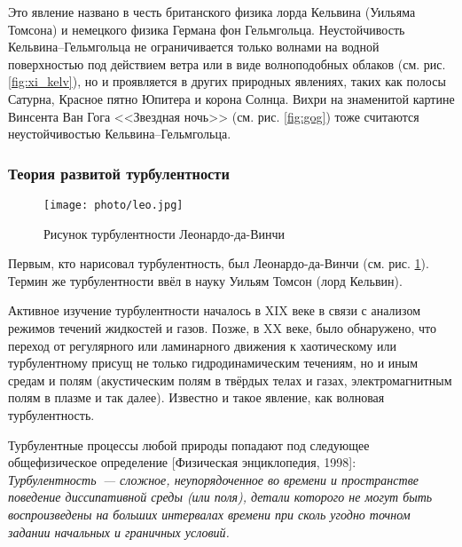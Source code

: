 
Это явление названо в честь британского физика лорда Кельвина (Уильяма Томсона) и немецкого физика Германа фон Гельмгольца. Неустойчивость Кельвина--Гельмгольца не ограничивается только волнами на водной поверхностью под действием ветра или  в виде волноподобных облаков (см. рис. \ref{fig:xi_kelv}), но и проявляется в других природных явлениях, таких как полосы Сатурна, Красное пятно Юпитера и корона Солнца. Вихри на знаменитой картине Винсента Ван Гога <<Звездная ночь>> (см. рис. \ref{fig:gog}) тоже считаются неустойчивостью Кельвина--Гельмгольца.


\subsubsection{Теория развитой турбулентности}
\begin{figure}[H]
	\centering
	\texttt{[image: photo/leo.jpg]}
	\caption{Рисунок турбулентности Леонардо-да-Винчи}
	\label{fig:leo}
\end{figure}
Первым, кто нарисовал турбулентность, был Леонардо-да-Винчи (см. рис. \ref{fig:leo}). Термин же турбулентности ввёл в науку Уильям Томсон (лорд Кельвин).

Активное изучение турбулентности началось в XIX веке в связи с анализом режимов течений жидкостей и газов. Позже, в XX веке, было обнаружено, что переход от регулярного или ламинарного движения к хаотическому или турбулентному присущ не только гидродинамическим течениям, но и иным средам и полям (акустическим полям в твёрдых телах и газах, электромагнитным полям в плазме и так далее). Известно и такое явление, как волновая турбулентность.

Турбулентные процессы любой природы попадают под следующее общефизическое определение [Физическая энциклопедия, 1998]:
\textit{Турбулентность~--- сложное, неупорядоченное во времени и
 пространстве поведение диссипативной среды (или поля),
 детали которого не могут быть воспроизведены на больших
 интервалах времени при сколь угодно точном задании
 начальных и граничных условий.}


